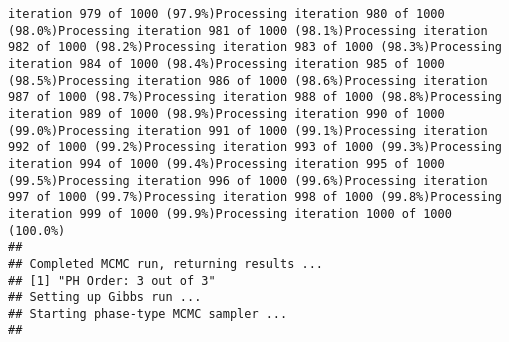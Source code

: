 \documentclass[
]{article}
\begin{document}
\begin{verbatim}
iteration 979 of 1000 (97.9%)Processing iteration 980 of 1000 (98.0%)Processing iteration 981 of 1000 (98.1%)Processing iteration 982 of 1000 (98.2%)Processing iteration 983 of 1000 (98.3%)Processing iteration 984 of 1000 (98.4%)Processing iteration 985 of 1000 (98.5%)Processing iteration 986 of 1000 (98.6%)Processing iteration 987 of 1000 (98.7%)Processing iteration 988 of 1000 (98.8%)Processing iteration 989 of 1000 (98.9%)Processing iteration 990 of 1000 (99.0%)Processing iteration 991 of 1000 (99.1%)Processing iteration 992 of 1000 (99.2%)Processing iteration 993 of 1000 (99.3%)Processing iteration 994 of 1000 (99.4%)Processing iteration 995 of 1000 (99.5%)Processing iteration 996 of 1000 (99.6%)Processing iteration 997 of 1000 (99.7%)Processing iteration 998 of 1000 (99.8%)Processing iteration 999 of 1000 (99.9%)Processing iteration 1000 of 1000 (100.0%)
## 
## Completed MCMC run, returning results ...
## [1] "PH Order: 3 out of 3"
## Setting up Gibbs run ...
## Starting phase-type MCMC sampler ...
## 

\end{verbatim}
\end{document}
